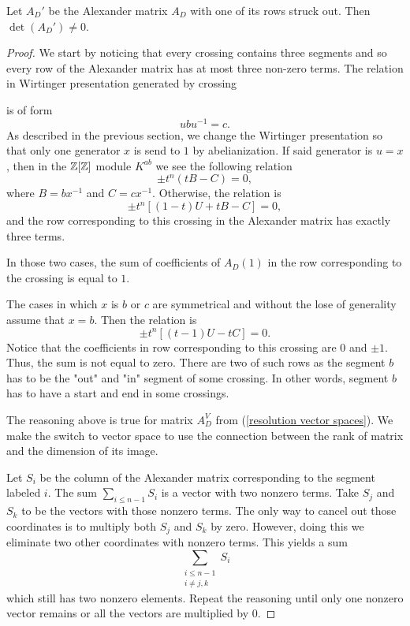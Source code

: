 \begin{proposition}\label{alexander matrix has trivial kernel}
  Let $A_D'$ be the Alexander matrix $A_D$ with one of its rows struck out. Then $\det(A_D')\neq 0$.
\end{proposition}

\begin{proof}
  We start by noticing that every crossing contains three segments and so every row of the Alexander matrix has at most three non-zero terms. The relation in Wirtinger presentation generated by crossing 
  \begin{center}
  \end{center}
  is of form
  $$ubu^{-1}=c.$$
  As described in the previous section, we change the Wirtinger presentation so that only one generator $x$ is send to $1$ by abelianization. If said generator is $u=x$, then in the $\operatorname{\mathbb{Z}}[\operatorname{\mathbb{Z}}]$ module $K^{ab}$ we see the following relation 
  $$\pm t^n(tB-C)=0,$$
  where $B=bx^{-1}$ and $C=cx^{-1}$. Otherwise, the relation is
  $$\pm t^n[(1-t)U+tB-C]=0,$$
  and the row corresponding to this crossing in the Alexander matrix has exactly three terms.

  In those two cases, the sum of coefficients of $A_D(1)$ in the row corresponding to the crossing is equal to $1$.

  The cases in which $x$ is $b$ or $c$ are symmetrical and without the lose of generality assume that $x=b$. Then the relation is 
  $$\pm t^n[(t-1)U-tC]=0.$$
  Notice that the coefficients in row corresponding to this crossing are $0$ and $\pm1$. Thus, the sum is not equal to zero. There are two of such rows as the segment $b$ has to be the "out" and "in" segment of some crossing. In other words, segment $b$ has to have a start and end in some crossings.

  The reasoning above is true for matrix $A_D^V$ from (\ref{resolution vector spaces}). We make the switch to vector space to use the connection between the rank of matrix and the dimension of its image.

  Let $S_i$ be the column of the Alexander matrix corresponding to the segment labeled $i$. The sum $\sum_{i\leq n-1} S_i$ is a vector with two nonzero terms. Take $S_j$ and $S_k$ to be the vectors with those nonzero terms. The only way to cancel out those coordinates is to multiply both $S_j$ and $S_k$ by zero. However, doing this we eliminate two other coordinates with nonzero terms. This yields a sum
  $$\sum_{\substack{i\leq n-1 \\ i\neq j,k}}S_i$$ 
  which still has two nonzero elements. Repeat the reasoning until only one nonzero vector remains or all the vectors are multiplied by $0$.


\end{proof}
